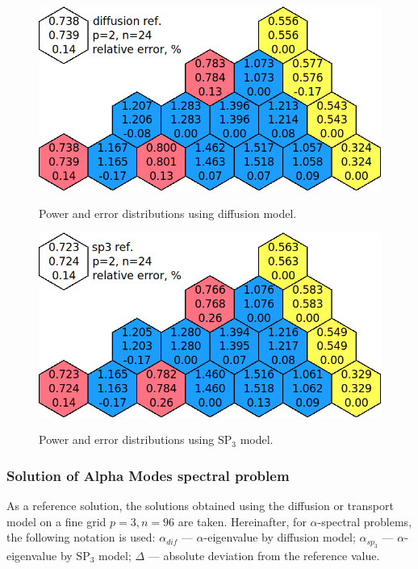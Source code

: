 \documentclass[authoryear]{elsarticle}
\begin{document}
\begin{figure}[htp]
\begin{center}
	\includegraphics[width=0.85\linewidth]{diff_without_p2n24.png}\\
	\caption{Power and error distributions using diffusion model.}
	\label{fig:power_iaea_without_dif}
\end{center}
\end{figure}
\begin{figure}[htp]
\begin{center}
	\includegraphics[width=0.85\linewidth]{sp3_without_p2n24.png}\\
	\caption{Power and error distributions using $\mathrm{SP_3}$ model.}
	\label{fig:power_ieae_without_sp3}
\end{center}
\end{figure}

\subsubsection{Solution of Alpha Modes spectral problem}
As a reference solution, the solutions obtained using the diffusion or transport model on a fine grid $ p = 3, n = 96 $ are taken.
Hereinafter, for $\alpha$-spectral problems, the following notation is used: $\alpha_{dif}$ --- $\alpha$-eigenvalue by diffusion model; $\alpha_{sp_3}$ --- $\alpha$-eigenvalue by $\mathrm{SP_3}$ model; $\Delta$ --- absolute deviation from the reference value.
\end{document}

